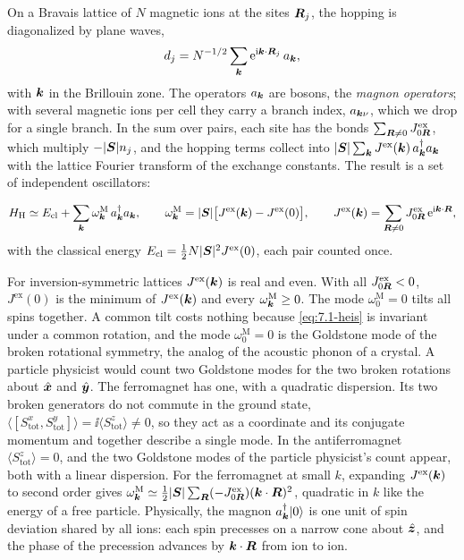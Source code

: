 On a Bravais lattice of $N$ magnetic ions at the sites $\bm{R}_j$, the hopping is diagonalized by plane waves,
\begin{equation*}
  d_j = N^{-1/2}\sum_{\bm{k}}\mathrm{e}^{\mathrm{i}\bm{k}\cdot\bm{R}_j}\,a_{\bm{k}} ,
\end{equation*}
with $\bm{k}$ in the Brillouin zone. The operators $a_{\bm{k}}$ are bosons, the \emph{magnon operators}; with several magnetic ions per cell they carry a branch index, $a_{\bm{k}\nu}$, which we drop for a single branch. In the sum over pairs, each site has the bonds $\sum_{\bm{R}\neq0}J^{\mathrm{ex}}_{0\bm{R}}$, which multiply $-|\bm{S}|n_j$, and the hopping terms collect into $|\bm{S}|\sum_{\bm{k}}J^{\mathrm{ex}}(\bm{k})\,a^\dagger_{\bm{k}}a_{\bm{k}}$ with the lattice Fourier transform of the exchange constants. The result is a set of independent oscillators:
\begin{keyresult}
\begin{equation}
  H_{\mathrm{H}} \simeq E_{\mathrm{cl}} + \sum_{\bm{k}}\omega^{\mathrm{M}}_{\bm{k}}\,a^\dagger_{\bm{k}}a_{\bm{k}}, \qquad
  \omega^{\mathrm{M}}_{\bm{k}} = |\bm{S}|\bigl[J^{\mathrm{ex}}(\bm{k}) - J^{\mathrm{ex}}(0)\bigr], \qquad
  J^{\mathrm{ex}}(\bm{k}) = \sum_{\bm{R}\neq0}J^{\mathrm{ex}}_{0\bm{R}}\,\mathrm{e}^{\mathrm{i}\bm{k}\cdot\bm{R}} ,
  \label{eq:7.1-fm}
\end{equation}
with the classical energy $E_{\mathrm{cl}} = \frac12N|\bm{S}|^2J^{\mathrm{ex}}(0)$, each pair counted once.
\end{keyresult}
For inversion-symmetric lattices $J^{\mathrm{ex}}(\bm{k})$ is real and even. With all $J^{\mathrm{ex}}_{0\bm{R}} < 0$, $J^{\mathrm{ex}}(0)$ is the minimum of $J^{\mathrm{ex}}(\bm{k})$ and every $\omega^{\mathrm{M}}_{\bm{k}} \ge 0$. The mode $\omega^{\mathrm{M}}_0 = 0$ tilts all spins together. A common tilt costs nothing because \cref{eq:7.1-heis} is invariant under a common rotation, and the mode $\omega^{\mathrm{M}}_0 = 0$ is the Goldstone mode of the broken rotational symmetry, the analog of the acoustic phonon of a crystal. A particle physicist would count two Goldstone modes for the two broken rotations about $\hat{\bm{x}}$ and $\hat{\bm{y}}$. The ferromagnet has one, with a quadratic dispersion. Its two broken generators do not commute in the ground state, $\langle[S^x_{\mathrm{tot}}, S^y_{\mathrm{tot}}]\rangle = \ii\langle S^z_{\mathrm{tot}}\rangle \ne 0$, so they act as a coordinate and its conjugate momentum and together describe a single mode. In the antiferromagnet $\langle S^z_{\mathrm{tot}}\rangle = 0$, and the two Goldstone modes of the particle physicist's count appear, both with a linear dispersion. For the ferromagnet at small $k$, expanding $J^{\mathrm{ex}}(\bm{k})$ to second order gives $\omega^{\mathrm{M}}_{\bm{k}} \simeq \frac12|\bm{S}|\sum_{\bm{R}}(-J^{\mathrm{ex}}_{0\bm{R}})(\bm{k}\cdot\bm{R})^2$, quadratic in $k$ like the energy of a free particle. Physically, the magnon $a^\dagger_{\bm{k}}|0\rangle$ is one unit of spin deviation shared by all ions: each spin precesses on a narrow cone about $\hat{\bm{z}}$, and the phase of the precession advances by $\bm{k}\cdot\bm{R}$ from ion to ion.


